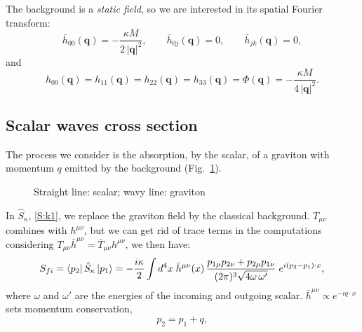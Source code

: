 \documentclass[12pt,a4paper,oneside]{article}
\numberwithin{equation}{section}   %
\begin{document}
The background is a \textit{static field}, so we are interested in its spatial
Fourier transform:
\begin{equation}
    \label{eq:epsilon}
    \bar h_{00}(\mathbf q)=-\frac{\kappa M}{2\,|\mathbf q|^{2}},\qquad
    \bar h_{0j}(\mathbf q)=0,\qquad
    \bar h_{jk}(\mathbf q)=0 ,
\end{equation}
and
\begin{equation}
  \label{eq:Phi}
  h_{00}(\mathbf q)=h_{11}(\mathbf q)=h_{22}(\mathbf q)=h_{33}(\mathbf q)
  =\Phi(\mathbf q)=-\frac{\kappa M}{4\,|\mathbf q|^2}.
\end{equation}

\subsection{Scalar waves cross section}
\label{subsec:amplitude}
The process we consider is the absorption, by the scalar, of a graviton with
momentum $q$ emitted by the background (Fig.~\ref{fig:external-field}).
\begin{figure}[H]
\centering
{}
\caption{Straight line: scalar; wavy
line: graviton}
\label{fig:external-field}
\end{figure}
In $\hat S_\kappa$, \eqref{S:k1}, we replace the graviton field by the classical
background. $T_{\mu\nu}$ combines with
$h^{\mu\nu}$, but we can get rid of trace terms in the computations
considering ${T}_{\mu\nu}\bar h^{\mu\nu}= \bar T_{\mu\nu}h^{\mu\nu}$, we then have:
\begin{equation}
    \label{eq:amplitude}
    S_{fi}=\bra{p_2}\hat S_\kappa\ket{p_1}
    =-\frac{i\kappa}{2}\int d^4x\;\bar h^{\mu\nu}(x)\,
    \frac{p_{1\mu} p_{2\nu}+p_{2\mu} p_{1\nu}}{(2\pi)^3\sqrt{4\omega\,\omega'}}\;
    e^{i(p_2-p_1)\cdot x},
\end{equation}
where $\omega$ and $\omega'$ are the energies of the incoming and outgoing
scalar. $\bar h^{\mu\nu}\propto e^{-iq\cdot x}$ sets
momentum conservation,
\begin{equation}
    \label{eq:momentum-conservation}
    p_2=p_1+q ,
\end{equation}
\end{document}
